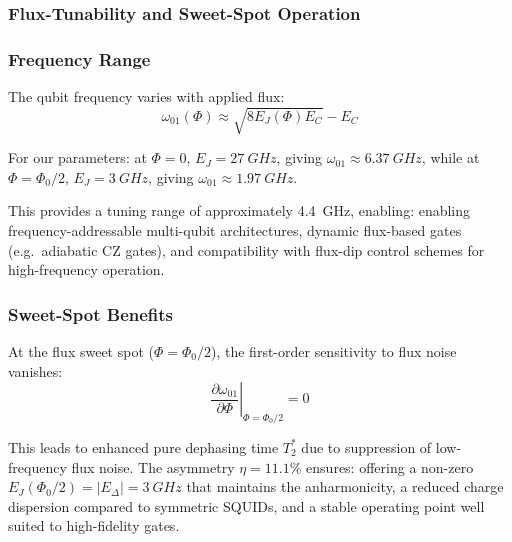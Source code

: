 \subsubsection{Flux-Tunability and Sweet-Spot Operation}

\subsubsection{Frequency Range}

The qubit frequency varies with applied flux:
\begin{equation}
\omega_{01}(\Phi) \approx \sqrt{8E_J(\Phi)E_C} - E_C
\end{equation}

For our parameters:
at $\Phi = 0$, $E_J = \SI{27}{GHz}$, giving $\omega_{01} \approx \SI{6.37}{GHz}$, while at $\Phi = \Phi_0/2$, $E_J = \SI{3}{GHz}$, giving $\omega_{01} \approx \SI{1.97}{GHz}$.

This provides a tuning range of approximately \SI{4.4}{GHz}, enabling:
enabling frequency-addressable multi-qubit architectures, dynamic flux-based gates (e.g.\ adiabatic CZ gates), and compatibility with flux-dip control schemes for high-frequency operation.

\subsubsection{Sweet-Spot Benefits}

At the flux sweet spot ($\Phi = \Phi_0/2$), the first-order sensitivity to flux noise vanishes:
\begin{equation}
\left.\frac{\partial\omega_{01}}{\partial\Phi}\right|_{\Phi=\Phi_0/2} = 0
\end{equation}

This leads to enhanced pure dephasing time $T_2^*$ due to suppression of low-frequency flux noise. The asymmetry $\eta = 11.1\%$ ensures:
offering a non-zero $E_J(\Phi_0/2) = |E_\Delta| = \SI{3}{GHz}$ that maintains the anharmonicity, a reduced charge dispersion compared to symmetric SQUIDs, and a stable operating point well suited to high-fidelity gates.

